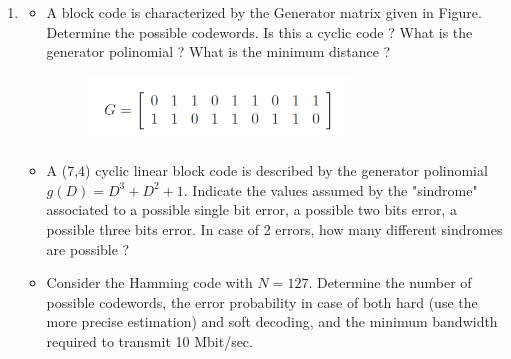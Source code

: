\documentclass[11pt]{article}
\begin{document}
\begin{enumerate}
\item 
\begin{itemize}
\item A block code is characterized by the Generator matrix given in Figure. Determine the possible codewords. Is this a cyclic code ? What is the generator polinomial ? What is the minimum distance ? 
\begin{figure}[ht] \centering
\includegraphics[width=7cm]{Fig1}
\end{figure}
\item A (7,4) cyclic linear block code is described by the generator polinomial $g(D)=D^3+D^2+1$. Indicate the values assumed by the "sindrome" associated to a possible single bit error, a possible two bits error, a possible three bits error. In case of 2 errors, how many different sindromes are possible ?
\item Consider the Hamming code with $N=127$. Determine the number of possible codewords, the error probability in case of both hard (use the more precise estimation) and soft decoding, and the minimum bandwidth required to transmit 10 Mbit/sec.

\end{itemize}
\end{enumerate}
\end{document}
